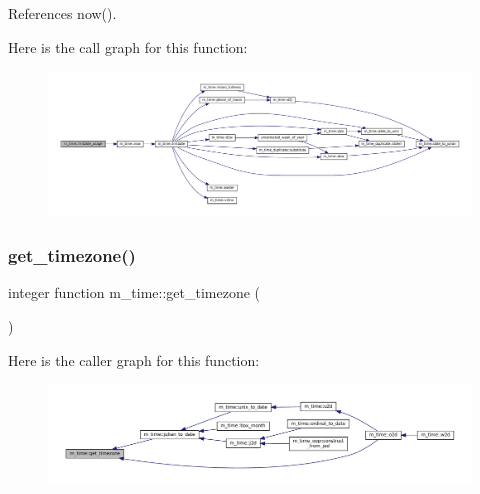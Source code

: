 References now().

Here is the call graph for this function\+:\nopagebreak
\begin{figure}[H]
\begin{center}
\leavevmode
\includegraphics[width=350pt]{namespacem__time_a914927f70fb9495af1be2e484b967111_cgraph}
\end{center}
\end{figure}
\mbox{\label{namespacem__time_a7903410a1d28bcdf3d33ab0c2d74b124}} 
\subsubsection{\texorpdfstring{get\+\_\+timezone()}{get\_timezone()}}
{\footnotesize\ttfamily integer function m\+\_\+time\+::get\+\_\+timezone (\begin{DoxyParamCaption}{ }\end{DoxyParamCaption})\hspace{0.3cm}{\ttfamily [private]}}

Here is the caller graph for this function\+:\nopagebreak
\begin{figure}[H]
\begin{center}
\leavevmode
\includegraphics[width=350pt]{namespacem__time_a7903410a1d28bcdf3d33ab0c2d74b124_icgraph}
\end{center}
\end{figure}
\mbox{\label{namespacem__time_aa5198c7aa4f3d8411c8ce93046ce3794}} 
